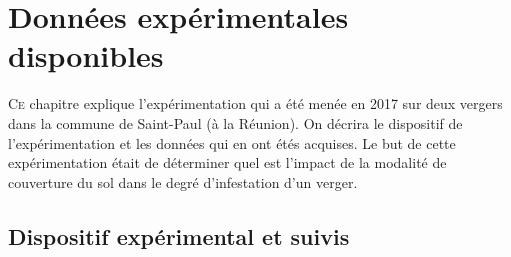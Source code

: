 \chapter{Données expérimentales disponibles} 

\lettrine{C}{e} chapitre explique l'expérimentation qui a été menée en 2017 sur deux vergers dans la commune de Saint-Paul (à la Réunion). 
On décrira le dispositif de l'expérimentation et les données qui en ont étés acquises.
Le but de cette expérimentation était de déterminer quel est l'impact de la modalité de couverture du sol dans le degré d'infestation d'un verger.


\section{Dispositif expérimental et suivis}

